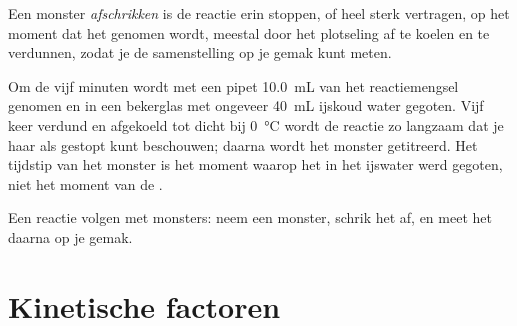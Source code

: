 \begin{definition}[Afschrikken]\label{def:g12:reaction-rates:quenching}
Een monster \emph{afschrikken} is de reactie erin
stoppen, of heel sterk vertragen, op het moment dat het genomen wordt,
meestal door het plotseling af te koelen en te verdunnen, zodat je de
samenstelling op je gemak kunt meten.
\end{definition}

\begin{inthelab}
Om de vijf minuten wordt met een pipet \qty{10.0}{mL} van het
reactiemengsel genomen en in een bekerglas met ongeveer \qty{40}{mL}
ijskoud water gegoten. Vijf keer verdund en afgekoeld tot dicht bij
\qty{0}{\celsius} wordt de reactie zo langzaam dat je haar als gestopt
kunt beschouwen; daarna wordt het monster getitreerd. Het tijdstip van het
monster is het moment waarop het in het ijswater werd gegoten, niet het
moment van de .
\end{inthelab}

\begin{omfigure}

{\small Een reactie volgen met monsters: neem een monster, schrik het af,
en meet het daarna op je gemak.}
\end{omfigure}

\section{Kinetische factoren}

